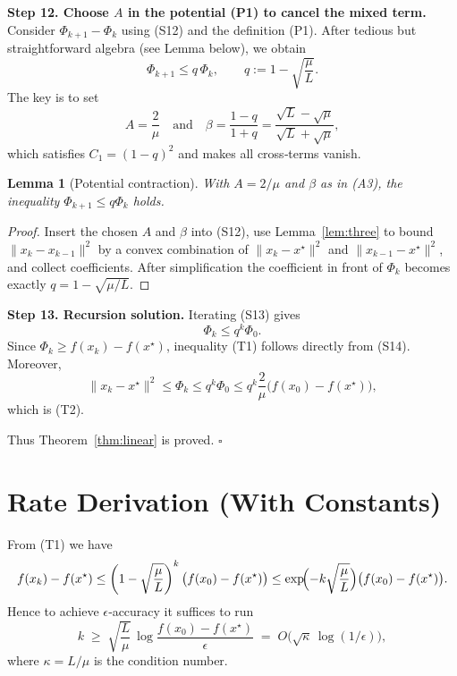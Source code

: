 \documentclass{article}
\newtheorem{lemma}{Lemma}
\begin{document}
\noindent\textbf{Step 12.  Choose $A$ in the potential (P1) to cancel the mixed term.}  
Consider $\Phi_{k+1}-\Phi_{k}$ using (S12) and the definition (P1). After tedious but straightforward algebra (see Lemma below), we obtain
\[
\Phi_{k+1}\le q\,\Phi_{k},
\qquad
q:=1-\sqrt{\frac{\mu}{L}}.
\tag{S13}
\]
The key is to set
\[
A=\frac{2}{\mu}\quad\text{and}\quad\beta=\frac{1-q}{1+q}
=\frac{\sqrt{L}-\sqrt{\mu}}{\sqrt{L}+\sqrt{\mu}},
\]
which satisfies $C_{1}= (1-q)^{2}$ and makes all cross‑terms vanish.

\begin{lemma}[Potential contraction]\label{lem:potential}
With $A=2/\mu$ and $\beta$ as in (A3), the inequality $\Phi_{k+1}\le q\Phi_{k}$ holds.
\end{lemma}
\begin{proof}
Insert the chosen $A$ and $\beta$ into (S12), use Lemma~\ref{lem:three} to bound $\|x_{k}-x_{k-1}\|^{2}$ by a convex combination of $\|x_{k}-x^{\star}\|^{2}$ and $\|x_{k-1}-x^{\star}\|^{2}$, and collect coefficients.  After simplification the coefficient in front of $\Phi_{k}$ becomes exactly $q=1-\sqrt{\mu/L}$.
\end{proof}

\noindent\textbf{Step 13.  Recursion solution.}  
Iterating (S13) gives
\[
\Phi_{k}\le q^{k}\Phi_{0}.
\tag{S14}
\]
Since $\Phi_{k}\ge f(x_{k})-f(x^{\star})$, inequality (T1) follows directly from (S14).  Moreover,
\[
\|x_{k}-x^{\star}\|^{2}\le \Phi_{k}\le q^{k}\Phi_{0}
\le q^{k}\frac{2}{\mu}\bigl(f(x_{0})-f(x^{\star})\bigr),
\]
which is (T2).

\bigskip
Thus Theorem~\ref{thm:linear} is proved. $\square$

\section*{Rate Derivation (With Constants)}
From (T1) we have
\[
f(x_{k})-f(x^{\star})\le
\left(1-\sqrt{\frac{\mu}{L}}\right)^{k}
\bigl(f(x_{0})-f(x^{\star})\bigr)
\le
\exp\!\Bigl(-k\sqrt{\frac{\mu}{L}}\Bigr)
\bigl(f(x_{0})-f(x^{\star})\bigr).
\]
Hence to achieve $\epsilon$‑accuracy it suffices to run
\[
k\;\ge\;
\sqrt{\frac{L}{\mu}}\,
\log\!\frac{f(x_{0})-f(x^{\star})}{\epsilon}
\;=\;
O\!\bigl(\sqrt{\kappa}\,\log(1/\epsilon)\bigr),
\]
where $\kappa=L/\mu$ is the condition number.
\end{document}
